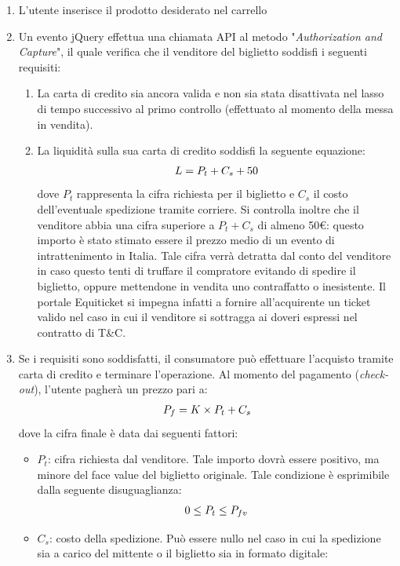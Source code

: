 \begin{enumerate}
\item L'utente inserisce il prodotto desiderato nel carrello
\item Un evento jQuery effettua una chiamata API al metodo "\textit{Authorization and Capture}", il quale verifica che il venditore del biglietto soddisfi i seguenti requisiti: 
\begin{enumerate}
\item La carta di credito sia ancora valida e non sia stata disattivata nel lasso di tempo successivo al primo controllo (effettuato al momento della messa in vendita).
\item La liquidità sulla sua carta di credito soddisfi la seguente equazione: 
\begin{align*}
\textbf{$ L = P_{t} + C_{s} + 50 $}
\end{align*}
dove $P_{t}$ rappresenta la cifra richiesta per il biglietto e $C_{s}$ il costo dell'eventuale spedizione tramite corriere. Si controlla inoltre che il venditore abbia una cifra superiore a $P_{t} + C_{s}$ di almeno 50€: questo importo è stato stimato essere il prezzo medio di un evento di intrattenimento in Italia. Tale cifra verrà detratta dal conto del venditore in caso questo tenti di truffare il compratore evitando di spedire il biglietto, oppure mettendone in vendita uno contraffatto o inesistente. Il portale Equiticket si impegna infatti a fornire all'acquirente un ticket valido nel caso in cui il venditore si sottragga ai doveri espressi nel contratto di T\&C.
\end{enumerate}
\item Se i requisiti sono soddisfatti, il consumatore può effettuare l'acquisto tramite carta di credito e terminare l'operazione. Al momento del pagamento (\textit{check-out}), l'utente pagherà un prezzo pari a: 
\begin{align*}
\textbf{$ P_{f} = K \times{P_{t}} + C_{s} $}
\end{align*}
dove la cifra finale è data dai seguenti fattori: 
\begin{itemize}
\item $P_{t}$: cifra richiesta dal venditore. Tale importo dovrà essere positivo, ma minore del face value del biglietto originale. Tale condizione è esprimibile dalla seguente disuguaglianza: 
\begin{align*}
\textbf{$ 0 \leq{ P_{t}} \leq{ P_{fv}} $}
\end{align*}
\item $C_{s}$: costo della spedizione. Può essere nullo nel caso in cui la spedizione sia a carico del mittente o il biglietto sia in formato digitale: 

\end{itemize}
\end{enumerate}
